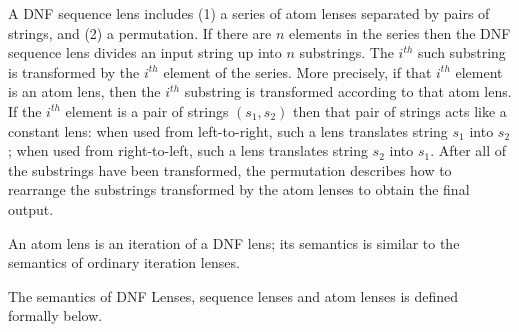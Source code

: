 \documentclass[numbers,10pt,preprint\ifanon ,nocopyrightspace\fi]{sigplanconf}
\begin{document}
A DNF sequence lens includes (1) a series of atom lenses separated by pairs of 
strings, and (2) a permutation. If there are $n$ elements in the series then
the DNF sequence lens divides an input string up into $n$ substrings.
The $i^{th}$ such substring is transformed by the $i^{th}$ element of the series.
More precisely, if that $i^{th}$ element is an atom lens, then the  $i^{th}$
substring is transformed according to that atom lens.  If the $i^{th}$ element
is a pair of strings $(s_1,s_2)$ then that pair of strings
acts like a constant lens: when used from left-to-right, such a lens 
translates string $s_1$ into $s_2$; when used from right-to-left, such a
lens translates string $s_2$ into $s_1$. 
After all of the substrings have been transformed,
the permutation describes how to rearrange the 
substrings transformed by the atom lenses to obtain the final output.

An atom lens is an iteration of a DNF lens; its semantics is similar to
the semantics of ordinary iteration lenses.

The semantics of DNF Lenses, sequence lenses and atom lenses 
is defined formally below.
\end{document}
